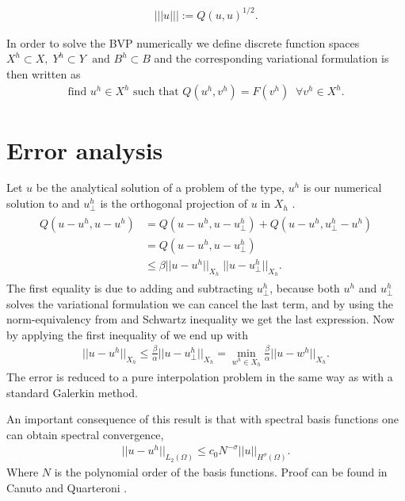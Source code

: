 \begin{align}
	||| u ||| := Q(u,u)^{1/2}.
	\label{eq:energynorm}
\end{align}

In order to solve the BVP numerically we define discrete function spaces $X^h \subset X, \; Y^h\subset Y \; \text{ and } B^h \subset B $ and the corresponding variational formulation is then written as 
\begin{align}
	\text{find } u^h \in X^h \text{  such that  } Q(u^h,v^h) = F(v^h) \; \; \forall v^h\in X^h.
	\label{eq:varFormGenDisc}
\end{align}
%
\section{Error analysis}
Let $u$ be the analytical solution of a problem of the type, $u^h$ is our numerical solution to and $u^h_{\perp} $ is the orthogonal projection of $u$ in $X_h$ \cite{bochev1998}. 
\begin{align}
	\begin{split}
	Q(u-u^h,u-u^h) &= Q(u-u^h,u-u^h_{\perp}) + Q(u-u^h,u^h_{\perp}-u^h) \\
							   &= Q(u-u^h,u-u^h_{\perp}) \\
							 	 &\leq \beta ||u-u^h||_{X_h} \; ||u-u^h_{\perp}||_{X_h}.
	\end{split}
	\label{eq:error1}
\end{align}
The first equality is due to adding and subtracting $u^h_{\perp}$, because both $u^h$ and $u^h_{\perp}$ solves the variational formulation we can cancel the last term, and by using the norm-equivalency from and Schwartz inequality we get the last expression. Now by applying the first inequality of we end up with 
\begin{align}
	||u-u^h||_{X_h}\leq \frac{\beta}{\alpha}||u-u^h_{\perp}||_{X_h} = \min_{w^h \in X_h}\frac{\beta}{\alpha}||u-w^h||_{X_h}.
	\label{error_final}
\end{align}
The error is reduced to a pure interpolation problem in the same way as with a standard Galerkin method. 

An important consequence of this result is that with spectral basis functions one can obtain spectral convergence, 
\begin{align}
	||u-u^h||_{L_2(\Omega)} \leq c_0N^{-\sigma}||u||_{H^{\sigma}(\Omega)}.
	\label{eq:spectralConvergence}
\end{align}
Where $N$ is the polynomial order of the basis functions.
Proof can be found in Canuto and Quarteroni \cite{Canuto}.
%

